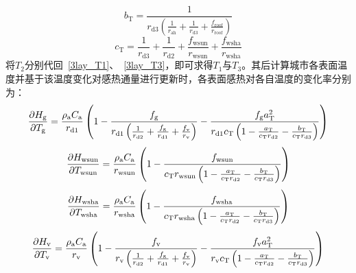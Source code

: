 %
\begin{equation}
  b_{\mathrm{T}} = \frac{1}{r_{\mathrm{d3}} \left(\frac{1}{r_{\mathrm{ah}}} + \frac{1}{r_{\mathrm{d3}}} + \frac{f_{\mathrm{roof}}}{r_{\mathrm{roof}}} \right)}
\end{equation}
%
\begin{equation}
  c_{\mathrm{T}} = \frac{1}{r_{\mathrm{d3}}} + \frac{1}{r_{\mathrm{d2}}} + \frac{f_{\mathrm{wsun}}}{r_{\mathrm{wsun}}} + \frac{f_{\mathrm{wsha}}}{r_{\mathrm{wsha}}}
\end{equation}
将$T_{\mathrm{2}}$分别代回~\eqref{3lay_T1}、~\eqref{3lay_T3}，即可求得$T_{\mathrm{1}}$与$T_{\mathrm{3}}$。其后计算城市各表面温度并基于该温度变化对感热通量进行更新时，各表面感热对各自温度的变化率分别为：
\begin{equation}
  \frac{\partial H_{\mathrm{g}}}{\partial T_{\mathrm{g}}} = \frac{\rho _{\rm a} C_{\mathrm a}}{r_{\mathrm{d1}}} \left(1-\frac{f_{\rm g}}{r_{\mathrm{d1}} \left(\frac{1}{r_{\mathrm{d2}}}+\frac{f_{\rm g}}{r_{\mathrm{d1}}}+\frac{f_{\rm v}}{r_{\rm v}}\right)} - \frac{f_{\rm g} a_{\mathrm{T}}^2}{r_{\mathrm{d1}} c_{\mathrm{T}} \left(1-\frac{a_{\mathrm{T}}}{c_{\mathrm{T}} r_{\mathrm{d2}}}-\frac{b_{\mathrm{T}}}{c_{\mathrm{T}} r_{\mathrm{d3}}}\right)}\right)
\end{equation}
%
\begin{equation}
  \frac{\partial H_{\mathrm{wsun}}}{\partial T_{\mathrm{wsun}}} = \frac{\rho _{\rm a} C_{\mathrm a}}{r_{\mathrm{wsun}}} \left(1-\frac{f_{\mathrm{wsun}}}{c_{\mathrm{T}} r_{\mathrm{wsun}} \left(1-\frac{a_{\mathrm{T}}}{c_{\mathrm{T}} r_{\mathrm{d2}}}-\frac{b_{\mathrm{T}}}{c_{\mathrm{T}} r_{\mathrm{d3}}}\right)}\right)
\end{equation}
%
\begin{equation}
  \frac{\partial H_{\mathrm{wsha}}}{\partial T_{\mathrm{wsha}}} = \frac{\rho _{\rm a} C_{\mathrm a}}{r_{\mathrm{wsha}}} \left(1-\frac{f_{\mathrm{wsha}}}{c_{\mathrm{T}} r_{\mathrm{wsha}} \left(1-\frac{a_{\mathrm{T}}}{c_{\mathrm{T}} r_{\mathrm{d2}}}-\frac{b_{\mathrm{T}}}{c_{\mathrm{T}} r_{\mathrm{d3}}}\right)}\right)
\end{equation}
%
\begin{equation}
  \frac{\partial H_{\mathrm{v}}}{\partial T_{\mathrm{v}}} = \frac{\rho _{\rm a} C_{\mathrm a}}{r_{\mathrm{v}}} \left(1-\frac{f_{\rm v}}{r_{\mathrm{v}} \left(\frac{1}{r_{\mathrm{d2}}}+\frac{f_{\rm g}}{r_{\mathrm{d1}}}+\frac{f_{\rm v}}{r_{\rm v}}\right)} - \frac{f_{\rm v} a_{\mathrm{T}}^2}{r_{\mathrm{v}} c_{\mathrm{T}} \left(1-\frac{a_{\mathrm{T}}}{c_{\mathrm{T}} r_{\mathrm{d2}}}-\frac{b_{\mathrm{T}}}{c_{\mathrm{T}} r_{\mathrm{d3}}}\right)}\right)
\end{equation}
